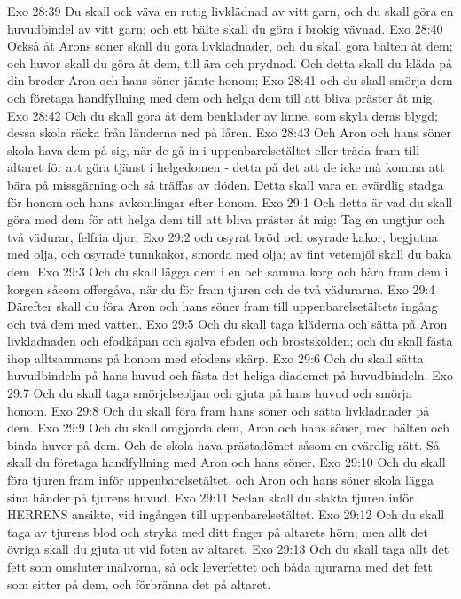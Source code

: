 Exo 28:39  Du skall ock väva en rutig livklädnad av vitt garn, och du skall göra en huvudbindel av vitt garn; och ett bälte skall du göra i brokig vävnad.
Exo 28:40  Också åt Arons söner skall du göra livklädnader, och du skall göra bälten åt dem; och huvor skall du göra åt dem, till ära och prydnad. Och detta skall du kläda på din broder Aron och hans söner jämte honom;
Exo 28:41  och du skall smörja dem och företaga handfyllning med dem och helga dem till att bliva präster åt mig.
Exo 28:42  Och du skall göra åt dem benkläder av linne, som skyla deras blygd; dessa skola räcka från länderna ned på låren.
Exo 28:43  Och Aron och hans söner skola hava dem på sig, när de gå in i uppenbarelsetältet eller träda fram till altaret för att göra tjänst i helgedomen - detta på det att de icke må komma att bära på missgärning och så träffas av döden. Detta skall vara en evärdlig stadga för honom och hans avkomlingar efter honom.
Exo 29:1  Och detta är vad du skall göra med dem för att helga dem till att bliva präster åt mig: Tag en ungtjur och två vädurar, felfria djur,
Exo 29:2  och osyrat bröd och osyrade kakor, begjutna med olja, och osyrade tunnkakor, smorda med olja; av fint vetemjöl skall du baka dem.
Exo 29:3  Och du skall lägga dem i en och samma korg och bära fram dem i korgen såsom offergåva, när du för fram tjuren och de två vädurarna.
Exo 29:4  Därefter skall du föra Aron och hans söner fram till uppenbarelsetältets ingång och två dem med vatten.
Exo 29:5  Och du skall taga kläderna och sätta på Aron livklädnaden och efodkåpan och själva efoden och bröstskölden; och du skall fästa ihop alltsammans på honom med efodens skärp.
Exo 29:6  Och du skall sätta huvudbindeln på hans huvud och fästa det heliga diademet på huvudbindeln.
Exo 29:7  Och du skall taga smörjelseoljan och gjuta på hans huvud och smörja honom.
Exo 29:8  Och du skall föra fram hans söner och sätta livklädnader på dem.
Exo 29:9  Och du skall omgjorda dem, Aron och hans söner, med bälten och binda huvor på dem. Och de skola hava prästadömet såsom en evärdlig rätt. Så skall du företaga handfyllning med Aron och hans söner.
Exo 29:10  Och du skall föra tjuren fram inför uppenbarelsetältet, och Aron och hans söner skola lägga sina händer på tjurens huvud.
Exo 29:11  Sedan skall du slakta tjuren inför HERRENS ansikte, vid ingången till uppenbarelsetältet.
Exo 29:12  Och du skall taga av tjurens blod och stryka med ditt finger på altarets hörn; men allt det övriga skall du gjuta ut vid foten av altaret.
Exo 29:13  Och du skall taga allt det fett som omsluter inälvorna, så ock leverfettet och båda njurarna med det fett som sitter på dem, och förbränna det på altaret.
